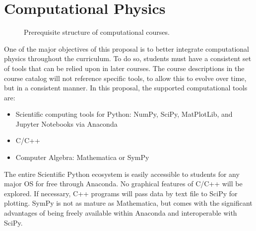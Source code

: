 \documentclass[12pt]{article}
\begin{document}
\section{Computational Physics}
\label{sec:comp}

\begin{figure}
\begin{center}

\caption{\label{fig:comps} Prerequisite structure of computational courses.}

\end{center}
\end{figure}

One of the major objectives of this proposal is to better integrate
computational physics throughout the curriculum.  To do so, students
must have a consistent set of tools that can be relied upon in later
courses.  The course descriptions in the course catalog will not
reference specific tools, to allow this to evolve over time, but in a
consistent manner.  In this proposal, the supported computational
tools are:
\begin{itemize}
\item Scientific computing tools for Python: NumPy, SciPy, MatPlotLib,
  and Jupyter Notebooks via Anaconda
\item C/C++
\item Computer Algebra:  Mathematica or SymPy
\end{itemize}
The entire Scientific Python ecosystem is easily accessible to
students for any major OS for free through Anaconda.  No graphical
features of C/C++ will be explored.  If necessary, C++ programs will
pass data by text file to SciPy for plotting.  SymPy is not as mature
as Mathematica, but comes with the significant advantages of being
freely available within Anaconda and interoperable with SciPy.
\end{document}
